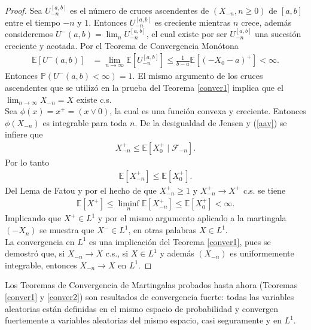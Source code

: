 \begin{proof}
Sea $U_{-n}^{[a, b]}$ es el número de cruces ascendentes de $(X_{-n}, n \geq 0)$ de $[a, b]$ entre el tiempo $-n$ y $1$. Entonces $U_{-n}^{[a, b]}$ es creciente mientras $n$ crece, además consideremos $U^{-}(a, b) = \lim_n U_{-n}^{[a, b]}$, el cual existe por ser $U_{-n}^{[a, b]}$ una sucesión creciente y acotada. Por el Teorema de Convergencia Monótona
	\begin{align*}
	\mathbb{E}[U^{-}(a, b)] & = \lim_{n \rightarrow \infty} \mathbb{E}[U_{-n}^{[a, b]}] \leq \frac{1}{b-a} \mathbb{E}[(-X_0 - a)^{+}] < \infty.
	\end{align*}
Entonces $\mathbb{P}(U^{-}(a, b) < \infty) = 1$. El mismo argumento de los cruces ascendentes que se utilizó en la prueba del Teorema \ref{conver1} implica que el $\lim_{n \rightarrow \infty} X_{-n} = X$ existe c.s. \\

Sea $\phi(x) = x^{+} = (x \vee 0)$, la cual es una función convexa y creciente. Entonces $\phi(X_{-n})$ es integrable para toda $n$. De la desigualdad de Jensen y (\ref{aav}) se infiere que 
	\begin{align*}
	X_{-n}^{+} \leq \mathbb{E}[X_0^{+} \mid \mathcal{F}_{-n}].
	\end{align*}
Por lo tanto
	\begin{align*}
	\mathbb{E}[X_{-n}^{+}] \leq \mathbb{E}[X_0^{+}].
	\end{align*}
Del Lema de Fatou y por el hecho de que $X_{-n}^{+} \geq 1$ y $X_{-n}^{+} \rightarrow X^{+}$ c.s. se tiene
	\begin{align*}
	\mathbb{E}[X^{+}] \leq \liminf_n \mathbb{E}[X_{-n}^{+}] \leq \mathbb{E}[X_0^{+}] < \infty.
	\end{align*}
Implicando que $X^{+} \in L^1$ y por el mismo argumento aplicado a la martingala $(-X_n)$ se muestra que $X^{-} \in L^1$, en otras palabras $X \in L^1$. \\

La convergencia en $L^1$ es una implicación del Teorema \ref{conver1}, pues se demostró que, si $X_{-n} \rightarrow X$ c.s., si $X \in L^1$ y además $(X_{-n})$ es uniformemente integrable, entonces $X_{-n} \rightarrow X$ en $L^1$.
\end{proof}

Los Teoremas de Convergencia de Martingalas probados hasta ahora (Teoremas \ref{conver1} y \ref{conver2}) son resultados de convergencia fuerte: todas las variables aleatorias están definidas en el mismo espacio de probabilidad y convergen fuertemente a variables aleatorias del mismo espacio, casi seguramente y en $L^1$. \\ 

